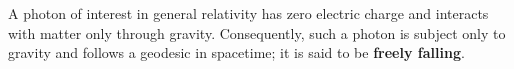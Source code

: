 A photon of interest in general relativity has zero electric charge and interacts with matter only through gravity. Consequently, such a photon is subject only to gravity and follows a geodesic in spacetime; it is said to be \textbf{freely falling}.
